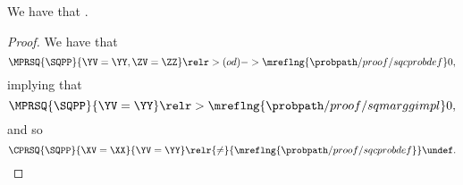 \begin{proposition}
  We have that \sqpcpproblimdefimplprop.%
\end{proposition}

\begin{proof}
  We have that 
  $$\MPRSQ{\SQPP}{\YV = \YY, \ZV = \ZZ} \relr > {(od)->\mreflng{\probpath/proof/sqcprobdef}} 0,$$ 
  implying that
  $$\MPRSQ{\SQPP}{\YV = \YY} \relr > {\mreflng{\probpath/proof/sqmarggimpl}} 0,$$
  and so
  $$\CPRSQ{\SQPP}{\XV = \XX}{\YV = \YY} \relr {\ne} {\mreflng{\probpath/proof/sqcprobdef}} \undef.$$%
\end{proof}
